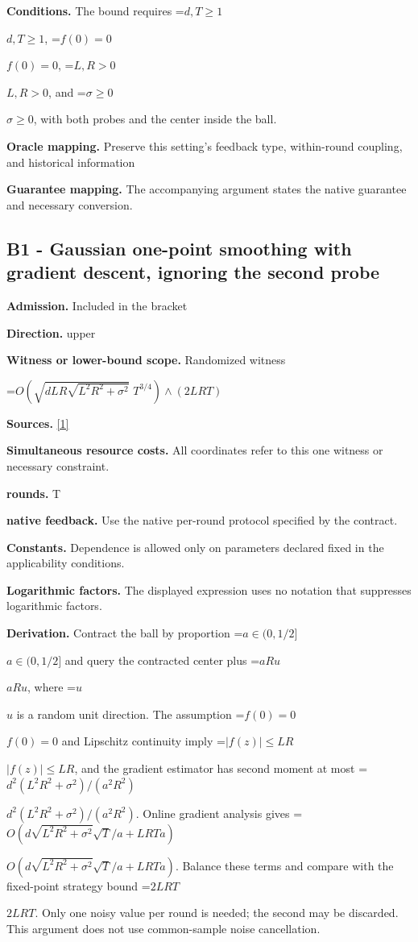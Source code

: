 \documentclass[10pt,a4paper]{article}
\newcommand{\AtlasMath}[1]{\par\begingroup\centering\setbox0=\hbox{$\displaystyle #1$}\ifdim\wd0>1.4\linewidth\typeout{ATLAS WIDE FORMULA: \the\wd0}\fi\ifdim\wd0>\linewidth\resizebox{\linewidth}{!}{\box0}\else\box0\fi\par\endgroup}
\newcommand{\AtlasInlineMath}[1]{\begingroup\setbox0=\hbox{$#1$}\ifdim\wd0>.4\linewidth\endgroup\AtlasMath{#1}\else\endgroup$#1$\fi}
\begin{document}
\textbf{Conditions.} The bound requires \AtlasInlineMath{d,T\ge 1}, \AtlasInlineMath{f(0)=0}, \AtlasInlineMath{L,R>0}, and \AtlasInlineMath{\sigma\ge 0}, with both probes and the center inside the ball.

\textbf{Oracle mapping.} Preserve this setting's feedback type, within-round coupling, and historical information

\textbf{Guarantee mapping.} The accompanying argument states the native guarantee and necessary conversion.

\subsection{B1 - Gaussian one-point smoothing with gradient descent, ignoring the second probe}
\textbf{Admission.} Included in the bracket

\textbf{Direction.} upper

\textbf{Witness or lower-bound scope.} Randomized witness

\AtlasMath{O\!\left(\sqrt{dLR\sqrt{L^2R^2+\sigma^2}}\;T^{3/4}\right)\wedge(2LRT)}
\textbf{Sources.} \href{https://arxiv.org/pdf/2607.18652v3}{[1]}

\textbf{Simultaneous resource costs.} All coordinates refer to this one witness or necessary constraint.

\textbf{rounds.} T

\textbf{native feedback.} Use the native per-round protocol specified by the contract.

\textbf{Constants.} Dependence is allowed only on parameters declared fixed in the applicability conditions.

\textbf{Logarithmic factors.} The displayed expression uses no notation that suppresses logarithmic factors.

\textbf{Derivation.} Contract the ball by proportion \AtlasInlineMath{a\in(0,1/2]} and query the contracted center plus \AtlasInlineMath{aRu}, where \AtlasInlineMath{u} is a random unit direction. The assumption \AtlasInlineMath{f(0)=0} and Lipschitz continuity imply \AtlasInlineMath{|f(z)|\le LR}, and the gradient estimator has second moment at most \AtlasInlineMath{d^2(L^2R^2+\sigma^2)/(a^2R^2)}. Online gradient analysis gives \AtlasInlineMath{O(d\sqrt{L^2R^2+\sigma^2}\sqrt T/a+LRTa)}. Balance these terms and compare with the fixed-point strategy bound \AtlasInlineMath{2LRT}. Only one noisy value per round is needed; the second may be discarded. This argument does not use common-sample noise cancellation.
\end{document}
